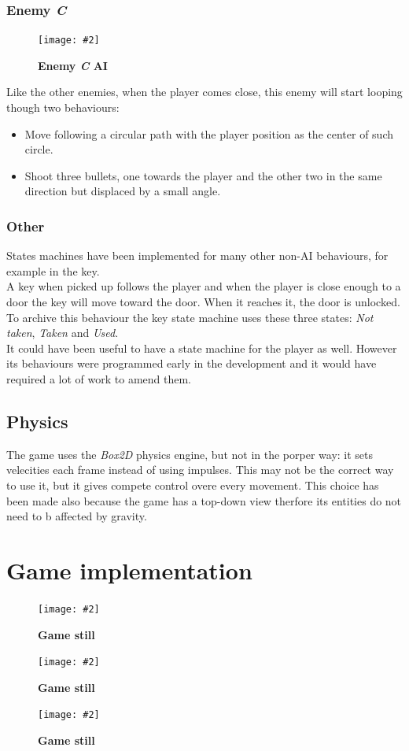 \documentclass[10pt, a4paper]{article}
\newcommand{\figuremacro}[5]{
    \begin{figure}[#1]
        \centering
        \texttt{[image: \#2]}
        \caption[#3]{\textbf{#3}#4}
        \label{fig:#2}
    \end{figure}
}
\begin{document}
    \subsubsection{Enemy \textit{C}}
    \figuremacro{h}{EnemyC}{Enemy \textit{C} AI}{}{1.0}
    Like the other enemies, when the player comes close, this enemy will start looping though two behaviours:
    \begin{itemize}
    	\item Move following a circular path with the player position as the center of such circle.
    	\item Shoot three bullets, one towards the player and the other two in the same direction but displaced by a small angle.
    \end{itemize}
    
    \subsubsection{Other}
    States machines have been implemented for many other non-AI behaviours, for example in the key.\\
    A key when picked up follows the player and when the player is close enough to a door the key will move toward the door. When it reaches it, the door is unlocked. To archive this behaviour the key state machine uses these three states: \textit{Not taken}, \textit{Taken} and \textit{Used}.\\
    It could have been useful to have a state machine for the player as well. However its behaviours were programmed early in the development and it would have required a lot of work to amend them.
    
    \subsection{Physics}
    The game uses the \textit{Box2D} physics engine, but not in the porper way: it sets velecities each frame instead of using impulses. This may not be the correct way to use it, but it gives compete control overe every movement. This choice has been made also because the game has a top-down view therfore its entities do not need to b affected by gravity.
    
    \section{Game implementation}
    \figuremacro{h}{capture01}{Game still}{}{1.0}
    \figuremacro{h}{capture02}{Game still}{}{1.0}
    \figuremacro{h}{capture03}{Game still}{}{1.0}
    
\end{document}
